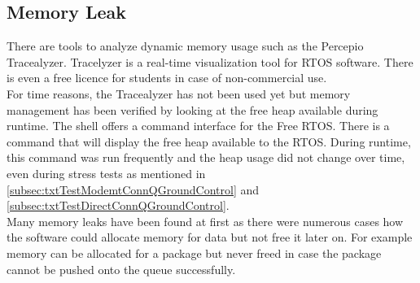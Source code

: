 \subsection{Memory Leak}
There are tools to analyze dynamic memory usage such as the Percepio Tracealyzer. Tracelyzer is a real-time visualization tool for RTOS software. There is even a free licence for students in case of non-commercial use.\\
For time reasons, the Tracealyzer has not been used yet but memory management has been verified by looking at the free heap available during runtime. The shell offers a command interface for the Free RTOS. There is a command that will display the free heap available to the RTOS. During runtime, this command was run frequently and the heap usage did not change over time, even during stress tests as mentioned in \autoref{subsec:txtTestModemtConnQGroundControl} and \autoref{subsec:txtTestDirectConnQGroundControl}.\\
Many memory leaks have been found at first as there were numerous cases how the software could allocate memory for data but not free it later on. For example memory can be allocated for a package but never freed in case the package cannot be pushed onto the queue successfully.
%
%
%
%
%
%
%
%
%
